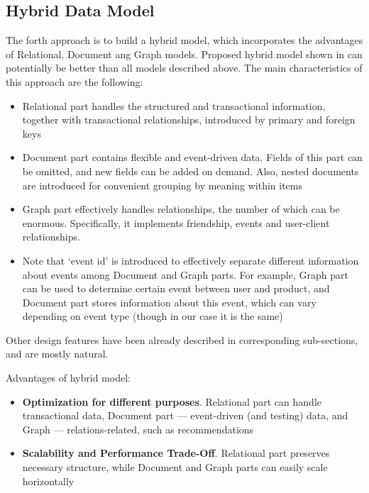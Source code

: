 \documentclass[conference]{IEEEtran}
\begin{document}
\subsection{Hybrid Data Model}
The forth approach is to build a hybrid model, which incorporates the advantages of Relational, Document ang Graph models. Proposed hybrid model shown in  can potentially be better than all models described above. The main characteristics of this approach are the following:
\begin{itemize}
    \item Relational part handles the structured and transactional information, together with transactional relationships, introduced by primary and foreign keys
    \item Document part contains flexible and event-driven data. Fields of this part can be omitted, and new fields can be added on demand. Also, nested documents are introduced for convenient grouping by meaning within items
    \item Graph part effectively handles relationships, the number of which can be enormous. Specifically, it implements friendship, events and user-client relationships.
    \item Note that `event id' is introduced to effectively separate different information about events among Document and Graph parts. For example, Graph part can be used to determine certain event between user and product, and Document part stores information about this event, which can vary depending on event type (though in our case it is the same)
\end{itemize}
Other design features have been already described in corresponding sub-sections, and are mostly natural.

Advantages of hybrid model:
\begin{itemize}
    \item \textbf{Optimization for different purposes}. Relational part can handle transactional data, Document part --- event-driven (and testing) data, and Graph --- relations-related, such as recommendations
    \item \textbf{Scalability and Performance Trade-Off}. Relational part preserves necessary structure, while Document and Graph parts can easily scale horizontally
\end{itemize}
\end{document}
